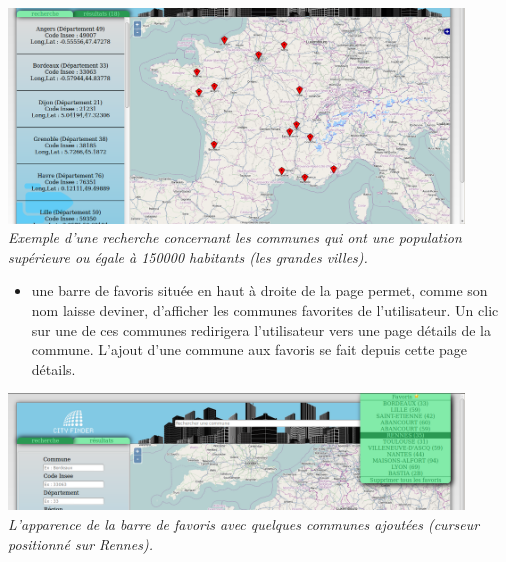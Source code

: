 \documentclass{report}
\begin{document}
\includegraphics[width=12.1cm]{main.png}
\\
\textit{Exemple d'une recherche concernant les communes qui ont une population supérieure ou égale à 150000 habitants (les grandes villes).}
\\
\begin{itemize}
\item une barre de favoris située en haut à droite de la page permet, comme son nom laisse deviner, d'afficher les communes favorites de l'utilisateur. Un clic sur une de ces communes redirigera l'utilisateur vers une page détails de la commune. L'ajout d'une commune aux favoris se fait depuis cette page détails.
\\
\end{itemize}
\includegraphics[width=12.1cm]{favoris.png}
\\
\textit{L'apparence de la barre de favoris avec quelques communes ajoutées (curseur positionné sur Rennes).}
\\\\
\end{document}

